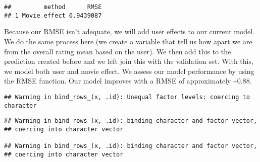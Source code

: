 \documentclass[]{article}
\newenvironment{Shaded}{\begin{snugshade}}{\end{snugshade}}
\newcommand{\KeywordTok}[1]{\textcolor[rgb]{0.13,0.29,0.53}{\textbf{#1}}}
\newcommand{\DataTypeTok}[1]{\textcolor[rgb]{0.13,0.29,0.53}{#1}}
\newcommand{\DecValTok}[1]{\textcolor[rgb]{0.00,0.00,0.81}{#1}}
\newcommand{\StringTok}[1]{\textcolor[rgb]{0.31,0.60,0.02}{#1}}
\newcommand{\OperatorTok}[1]{\textcolor[rgb]{0.81,0.36,0.00}{\textbf{#1}}}
\newcommand{\NormalTok}[1]{#1}
\begin{document}
\begin{verbatim}
##         method      RMSE
## 1 Movie effect 0.9439087
\end{verbatim}

Because our RMSE isn't adequate, we will add user effects to our current
model. We do the same process here (we create a variable that tell us
how apart we are from the overall rating mean based on the user). We
then add this to the prediction created before and we left join this
with the validation set. With this, we model both user and movie effect.
We assess our model performance by using the RMSE function. Our model
improves with a RMSE of approximately \textasciitilde{}0.88.

\begin{Shaded}
\end{Shaded}

\begin{verbatim}
## Warning in bind_rows_(x, .id): Unequal factor levels: coercing to character
\end{verbatim}

\begin{verbatim}
## Warning in bind_rows_(x, .id): binding character and factor vector,
## coercing into character vector

## Warning in bind_rows_(x, .id): binding character and factor vector,
## coercing into character vector
\end{verbatim}
\end{document}
